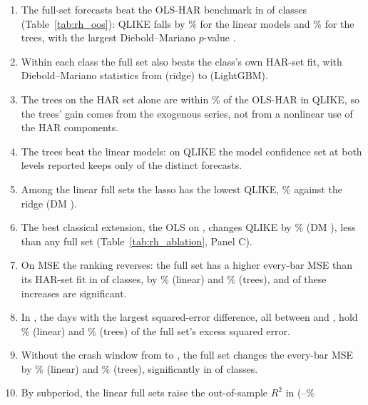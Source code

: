 \begin{enumerate}
\item The full-set forecasts beat the OLS-HAR benchmark in \rhorVsOlsFullLowerSig{} of \rhorVsOlsFullN{} classes
  (Table~\ref{tab:rh_oos}): QLIKE falls by \rhorVsOlsRedLinRng\% for the linear models and \rhorVsOlsRedTreeRng\% for the
  trees, with the largest Diebold--Mariano $p$-value \rhorVsOlsPMax.
\item Within each class the full set also beats the class's own HAR-set fit, with Diebold--Mariano statistics from
  \rhorDmRidgeB{} (ridge) to \rhorDmLgbmB{} (LightGBM).
\item The trees on the HAR set alone are within \rhorVsOlsPctTreeHarMaxAbs\% of the OLS-HAR in QLIKE, so the trees'
  gain comes from the exogenous series, not from a nonlinear use of the HAR components.
\item The trees beat the linear models: on QLIKE the model confidence set at both levels reported keeps only
  \rhmcsBarQlikeTmaxSetNinety{} of the \rhmcsNModelsWord{} distinct forecasts.
\item Among the linear full sets the lasso has the lowest QLIKE, \rhldPctLassoRidge\% against the ridge (DM
  \rhldDmLassoRidge).
\item The best classical extension, the OLS on \rhabBestOlsBench, changes QLIKE by \rhabOlsSharqlAllPct\% (DM
  \rhabOlsSharqlAllDm), less than any full set (Table~\ref{tab:rh_ablation}, Panel C).
\item On MSE the ranking reverses: the full set has a higher every-bar MSE than its HAR-set fit in
  \rhcaNMseHigherBarSpan{} of \rhorVsOlsFullN{} classes, by \rhcaLinMsePctBarSpanRng\% (linear) and
  \rhcaTreeMsePctBarSpanRng\% (trees), and \rhcaNMseHigherSigBarSpan{} of these increases are significant.
\item In \rhcaYearsOos, the \rhcaTopDays{} days with the largest squared-error difference, all between
  \rhcaTopFirstBarOos{} and \rhcaTopLastBarOos, hold \rhcaLinTopShareBarOosRng\% (linear) and
  \rhcaTreeTopShareBarOosRng\% (trees) of the full set's excess squared error.
\item Without the crash window from \rhcaCrashStart{} to \rhcaCrashEnd, the full set changes the every-bar MSE by
  \rhcaLinMsePctBarOosExCrashRng\% (linear) and \rhcaTreeMsePctBarOosExCrashRng\% (trees), significantly in
  \rhcaNMseLowerSigBarOosExCrash{} of \rhorVsOlsFullN{} classes.
\item By subperiod, the linear full sets raise the out-of-sample $R^2$ in \rhorSubALabel{} (\rhorSubARoosAfMin--\rhorSubARoosAfMax\%

\end{enumerate}
